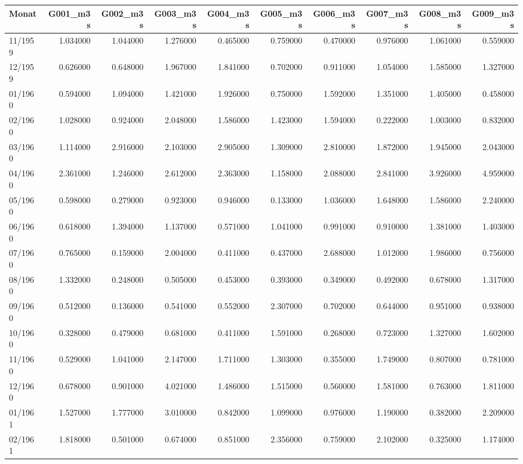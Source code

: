 \begin{tabular}{lrrrrrrrrr}
\toprule
Monat & G001_m3s & G002_m3s & G003_m3s & G004_m3s & G005_m3s & G006_m3s & G007_m3s & G008_m3s & G009_m3s \\
\midrule
11/1959 & 1.034000 & 1.044000 & 1.276000 & 0.465000 & 0.759000 & 0.470000 & 0.976000 & 1.061000 & 0.559000 \\
12/1959 & 0.626000 & 0.648000 & 1.967000 & 1.841000 & 0.702000 & 0.911000 & 1.054000 & 1.585000 & 1.327000 \\
01/1960 & 0.594000 & 1.094000 & 1.421000 & 1.926000 & 0.750000 & 1.592000 & 1.351000 & 1.405000 & 0.458000 \\
02/1960 & 1.028000 & 0.924000 & 2.048000 & 1.586000 & 1.423000 & 1.594000 & 0.222000 & 1.003000 & 0.832000 \\
03/1960 & 1.114000 & 2.916000 & 2.103000 & 2.905000 & 1.309000 & 2.810000 & 1.872000 & 1.945000 & 2.043000 \\
04/1960 & 2.361000 & 1.246000 & 2.612000 & 2.363000 & 1.158000 & 2.088000 & 2.841000 & 3.926000 & 4.959000 \\
05/1960 & 0.598000 & 0.279000 & 0.923000 & 0.946000 & 0.133000 & 1.036000 & 1.648000 & 1.586000 & 2.240000 \\
06/1960 & 0.618000 & 1.394000 & 1.137000 & 0.571000 & 1.041000 & 0.991000 & 0.910000 & 1.381000 & 1.403000 \\
07/1960 & 0.765000 & 0.159000 & 2.004000 & 0.411000 & 0.437000 & 2.688000 & 1.012000 & 1.986000 & 0.756000 \\
08/1960 & 1.332000 & 0.248000 & 0.505000 & 0.453000 & 0.393000 & 0.349000 & 0.492000 & 0.678000 & 1.317000 \\
09/1960 & 0.512000 & 0.136000 & 0.541000 & 0.552000 & 2.307000 & 0.702000 & 0.644000 & 0.951000 & 0.938000 \\
10/1960 & 0.328000 & 0.479000 & 0.681000 & 0.411000 & 1.591000 & 0.268000 & 0.723000 & 1.327000 & 1.602000 \\
11/1960 & 0.529000 & 1.041000 & 2.147000 & 1.711000 & 1.303000 & 0.355000 & 1.749000 & 0.807000 & 0.781000 \\
12/1960 & 0.678000 & 0.901000 & 4.021000 & 1.486000 & 1.515000 & 0.560000 & 1.581000 & 0.763000 & 1.811000 \\
01/1961 & 1.527000 & 1.777000 & 3.010000 & 0.842000 & 1.099000 & 0.976000 & 1.190000 & 0.382000 & 2.209000 \\
02/1961 & 1.818000 & 0.501000 & 0.674000 & 0.851000 & 2.356000 & 0.759000 & 2.102000 & 0.325000 & 1.174000 \\

\end{tabular}
